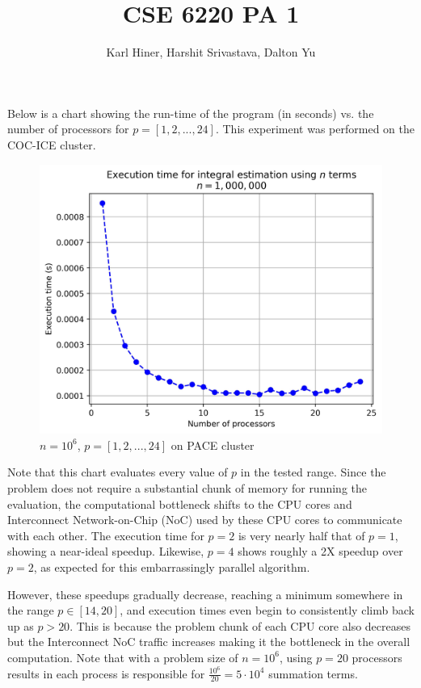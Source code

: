 \documentclass{article}
\begin{document}
\title{CSE 6220 PA 1}
\author{Karl Hiner, Harshit Srivastava, Dalton Yu}
\date{}
\maketitle

Below is a chart showing the run-time of the program (in seconds) vs. the number of processors for $p = [1,2,..., 24]$.
This experiment was performed on the COC-ICE cluster.

\begin{figure}[htb]
    \centering \includegraphics[scale = 0.75]{report_chart_n_1M_PACE.jpg}
    \caption{$n=10^6$, $p=[1,2,...,24]$ on PACE cluster}
    \label{fig:figure1}
\end{figure}

Note that this chart evaluates every value of $p$ in the tested range.
Since the problem does not require a substantial chunk of memory for running the evaluation, the computational bottleneck shifts to the CPU cores and Interconnect Network-on-Chip (NoC) used by these CPU cores to communicate with each other. The execution time for $p = 2$ is very nearly half that of $p = 1$, showing a near-ideal speedup. Likewise, $p = 4$ shows roughly a 2X speedup over $p = 2$, as expected for this embarrassingly parallel algorithm.

However, these speedups gradually decrease, reaching a minimum somewhere in the range $p \in [14, 20]$, and execution times even begin to consistently climb back up as $p > 20$.
This is because the problem chunk of each CPU core also decreases but the Interconnect NoC traffic increases making it the bottleneck in the overall computation.
Note that with a problem size of $n=10^6$, using $p=20$ processors results in each process is responsible for $\frac{10^6}{20} = 5\cdot 10^4$ summation terms.
\end{document}

